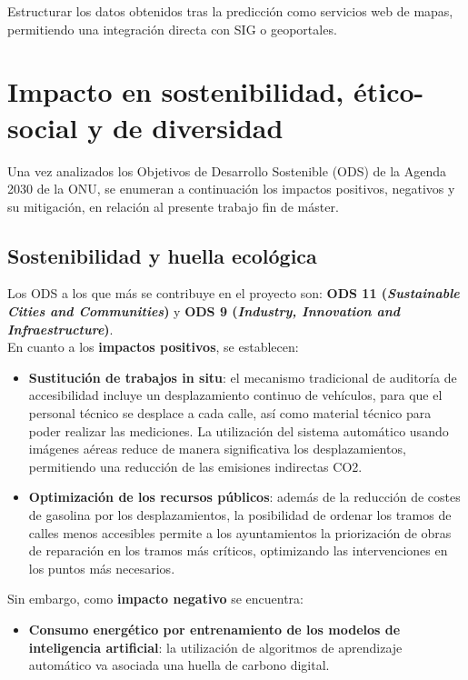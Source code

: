 Estructurar los datos obtenidos tras la predicción como servicios web de mapas, permitiendo una integración directa con \gls{SIG} o geoportales.
\\

\section{Impacto en sostenibilidad, ético-social y de diversidad}
\label{s:etic}

Una vez analizados los Objetivos de Desarrollo Sostenible (ODS) de la Agenda 2030 de la ONU, se enumeran a continuación los impactos positivos, negativos y su mitigación, en relación al presente trabajo fin de máster.

\subsection{Sostenibilidad y huella ecológica}

Los ODS a los que más se contribuye en el proyecto son: \textbf{ODS 11 (\textit{Sustainable Cities and Communities})} y \textbf{ODS 9 (\textit{Industry, Innovation and Infraestructure})}.
\\

En cuanto a los \textbf{impactos positivos}, se establecen:
\begin{itemize}
    \item \textbf{Sustitución de trabajos in situ}: el mecanismo tradicional de auditoría de accesibilidad incluye un desplazamiento continuo de vehículos, para que el personal técnico se desplace a cada calle, así como material técnico para poder realizar las mediciones. La utilización del sistema automático usando imágenes aéreas reduce de manera significativa los desplazamientos, permitiendo una reducción de las emisiones indirectas CO2.
    \item \textbf{Optimización de los recursos públicos}: además de la reducción de costes de gasolina por los desplazamientos, la posibilidad de ordenar los tramos de calles menos accesibles permite a los ayuntamientos la priorización de obras de reparación en los tramos más críticos, optimizando las intervenciones en los puntos más necesarios.
\end{itemize}

Sin embargo, como \textbf{impacto negativo} se encuentra:
\begin{itemize}
    \item \textbf{Consumo energético por entrenamiento de los modelos de inteligencia artificial}: la utilización de algoritmos de aprendizaje automático va asociada una huella de carbono digital.
\end{itemize}

